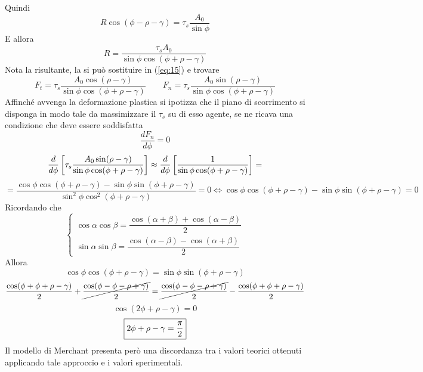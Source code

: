 \documentclass[a4paper, 15pt]{article}
\begin{document}
	Quindi
	\[R\cos(\phi-\rho-\gamma) = \tau_s\dfrac{A_0}{\sin\phi}\]
	E allora 
	\begin{equation}\label{eq:16}
		R = \dfrac{\tau_sA_0}{\sin\phi\cos(\phi+\rho-\gamma)}
	\end{equation}
	Nota la risultante, la si può sostituire in (\ref{eq:15}) e trovare
	\[F_t = \tau_s\dfrac{A_0\cos(\rho-\gamma)}{\sin\phi\cos(\phi+\rho-\gamma)}\qquad F_n = \tau_s\dfrac{A_0\sin(\rho-\gamma)}{\sin\phi\cos(\phi+\rho-\gamma)}\]
	Affinché avvenga la deformazione plastica si ipotizza che il piano di scorrimento si disponga in modo tale da massimizzare il $\tau_s$ su di esso agente, se ne ricava una condizione che deve essere soddisfatta
	\[\dfrac{dF_n}{d\phi} = 0\]
	\[{d\over d\phi}\left[\tau_s\dfrac{A_0\sin(\rho-\gamma)}{\sin\phi\cos(\phi+\rho-\gamma)}\right] \approx {d\over d\phi} \left[\dfrac{1}{\sin\phi\cos(\phi+\rho-\gamma)}\right] = \]
	\[ = \dfrac{\cos\phi\cos(\phi+\rho-\gamma)-\sin\phi\sin(\phi+\rho-\gamma)}{\sin^2\phi\cos^2(\phi+\rho-\gamma)} = 0 \Leftrightarrow \cos\phi\cos(\phi+\rho-\gamma)-\sin\phi\sin(\phi+\rho-\gamma)=0\]
	Ricordando che 
	\[\begin{cases}
		\cos\alpha\cos\beta=\dfrac{\cos(\alpha+\beta)+\cos(\alpha-\beta)}{2}\\
	\sin\alpha\sin\beta=\dfrac{\cos(\alpha-\beta)-\cos(\alpha+\beta)}{2}
	\end{cases} \]	
	Allora
	\[\cos\phi\cos(\phi+\rho-\gamma)=\sin\phi\sin(\phi+\rho-\gamma)\]
	\[\dfrac{\cos(\phi+\phi+\rho-\gamma)}{2} + \cancel{\dfrac{\cos(\phi-\phi-\rho+\gamma)}{2}} = \cancel{\dfrac{\cos(\phi-\phi-\rho+\gamma)}{2}} - \dfrac{\cos(\phi+\phi+\rho-\gamma)}{2}\]
	\[\cos(2\phi+\rho-\gamma) = 0 \]
	\begin{equation}\label{eq:17}
		\boxed{2\phi+\rho-\gamma = {\pi\over2}}
	\end{equation}
	Il modello di Merchant presenta però una discordanza tra i valori teorici ottenuti applicando tale approccio e i valori sperimentali.
\end{document}
